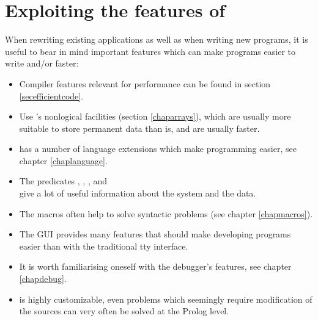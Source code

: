 \section{Exploiting the features of {\eclipse}}
When rewriting existing applications as well as when writing new programs,
it is useful to bear in mind important {\eclipse} features which can make
programs easier to write and/or faster:
\begin{itemize}
\item Compiler features relevant for performance can be found in section
\ref{secefficientcode}.

\item Use {\eclipse}'s nonlogical
 facilities
(section \ref{chaparrays}),
which are usually more suitable to store permanent data than
 is, and are usually
faster.

\item {\eclipse} has a number of language extensions which make programming
easier, see chapter \ref{chaplanguage}.

\item The predicates , ,
,  and\\
give a lot of useful information about the system and the data.

\item The {\eclipse} macros often help to solve syntactic problems
(see chapter \ref{chapmacros}).

\item The {\tkeclipse} GUI provides many features that should make
developing programs easier than with the traditional tty interface.

\item It is worth familiarising oneself with the debugger's features,
see chapter \ref{chapdebug}.

\item {\eclipse} is highly customizable, even problems which seemingly
require modification of the {\eclipse} sources
can very often be solved at the Prolog level.
\end{itemize}

